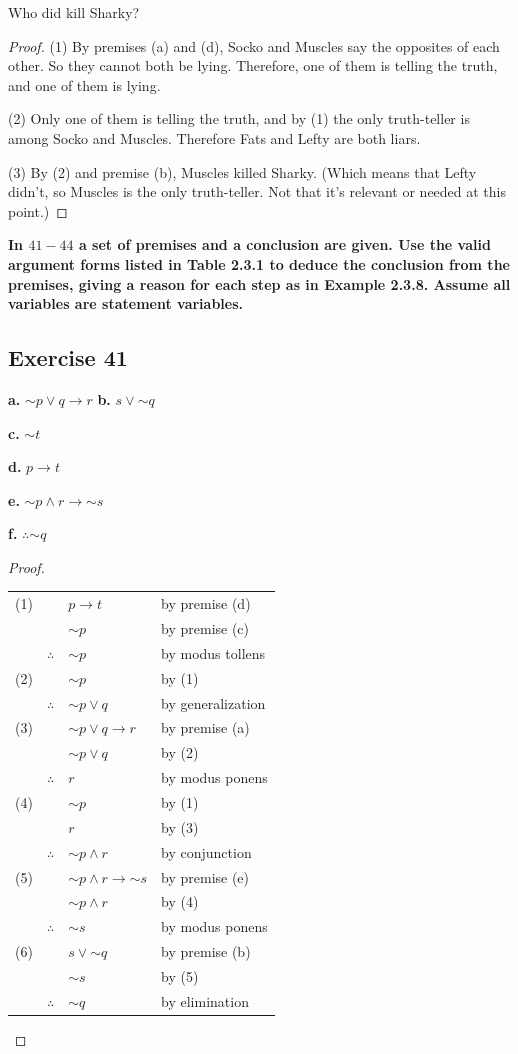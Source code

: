 \documentclass[14pt]{extarticle}
\begin{document}
Who did kill Sharky?

\begin{proof} (1) By premises (a) and (d), Socko and Muscles say the opposites
of each other. So they cannot both be lying. Therefore, one of them is telling
the truth, and one of them is lying.

(2) Only one of them is telling the truth, and by (1) the only truth-teller is
among Socko and Muscles. Therefore Fats and Lefty are both liars.

(3) By (2) and premise (b), Muscles killed Sharky. (Which means that Lefty
didn't, so Muscles is the only truth-teller. Not that it's relevant or needed at
this point.) \end{proof}

{\bf \color{cyan} In $41-44$ a set of premises and a conclusion are given. Use
the valid argument forms listed in Table 2.3.1 to deduce the conclusion from the
premises, giving a reason for each step as in Example 2.3.8. Assume all
variables are statement variables.}

\subsection{Exercise 41} {\bf a.} ${\sim p} \vee q \to r$
{\bf b.} $s \vee {\sim q}$

{\bf c.} ${\sim t}$

{\bf d.} $p \to t$

{\bf e.} ${\sim p} \wedge r \to {\sim s}$

{\bf f.} $\therefore {\sim q}$

\begin{proof} \begin{tabular}{rrll} (1) & & $p \to t$ & by premise (d) \\ & &
${\sim p}$ & by premise (c) \\ & $\therefore$ & ${\sim p}$ & by modus tollens \\
(2) & & ${\sim p}$ & by (1) \\ & $\therefore$ & ${\sim p} \vee q$ & by
generalization \\ (3) & & ${\sim p} \vee q \to r$ & by premise (a) \\ & & ${\sim
p} \vee q$ & by (2) \\ & $\therefore$ & $r$ & by modus ponens \\ (4) & & ${\sim
p}$ & by (1) \\ & & $r$ & by (3) \\ & $\therefore$ & ${\sim p} \wedge r$ & by
conjunction \\ (5) & & ${\sim p} \wedge r \to {\sim s}$ & by premise (e) \\ & &
${\sim p} \wedge r$ & by (4) \\ & $\therefore$ & ${\sim s}$ & by modus ponens \\
(6) & & $s \vee {\sim q}$ & by premise (b) \\ & & ${\sim s}$ & by (5) \\ &
$\therefore$ & ${\sim q}$ & by elimination \\ \end{tabular} \end{proof}
\end{document}
